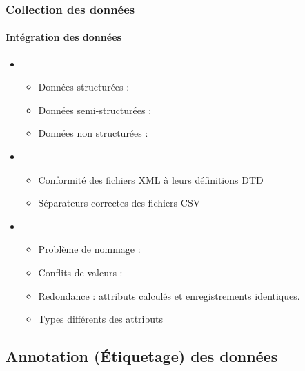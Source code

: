 \documentclass[xcolor=table]{beamer}
\begin{document}
\begin{frame}
\frametitle{Collection des données}
\framesubtitle{Intégration des données}

\begin{itemize}
	\item {}
	\begin{itemize}
		\item Données structurées : 
		\item Données semi-structurées : 
		\item Données non structurées : 
	\end{itemize}
	\item {}
	\begin{itemize}
		\item Conformité des fichiers XML à leurs définitions DTD
		\item Séparateurs correctes des fichiers CSV
	\end{itemize}
	\item {}
	\begin{itemize}
		\item Problème de nommage : 
		\item Conflits de valeurs : 
		\item Redondance : attributs calculés et enregistrements identiques.
		\item Types différents des attributs
	\end{itemize}
\end{itemize}

\end{frame}


\subsection{Annotation (Étiquetage) des données}
\end{document}
